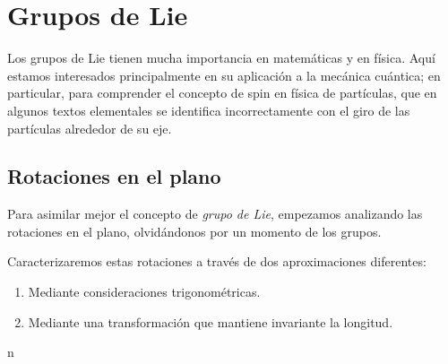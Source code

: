 %

\chapter{Grupos de Lie}
Los grupos de Lie tienen mucha importancia en matemáticas y en física.
Aquí estamos interesados principalmente en su aplicación a la mecánica cuántica; en particular, para comprender el concepto de spin en física de partículas, que en algunos textos elementales se identifica incorrectamente con el giro de las partículas alrededor de su eje.

\section{Rotaciones en el plano}
Para asimilar mejor el concepto de \emph{grupo de Lie}, empezamos analizando las rotaciones en el plano, olvidándonos por un momento de los grupos.

Caracterizaremos estas rotaciones a través de dos aproximaciones diferentes:
\begin{enumerate}
\item Mediante consideraciones trigonométricas.
\item Mediante una transformación que mantiene invariante la longitud.
\end{enumerate}
n

